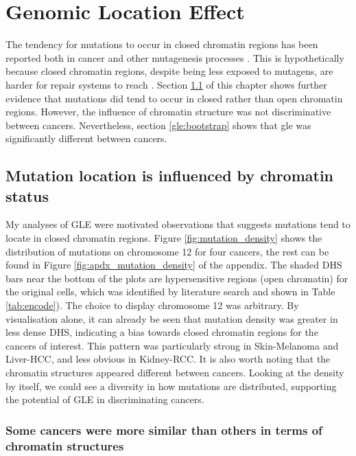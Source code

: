\chapter{Genomic Location Effect}\label{gle}

The tendency for mutations to occur in closed \gls{chromatin} regions has been reported both in cancer and other mutagenesis processes \citep{Polak2015,Prendergast2007ChromatinGenome}. This is hypothetically because closed chromatin regions, despite being less exposed to mutagens, are harder for repair systems to reach \citep{Prendergast2007ChromatinGenome,Teng1997ExcisionSequences, Morse2002PhotoreactivationCerevisiae}. Section \ref{gle:chromatin} of this chapter shows further evidence that mutations did tend to occur in closed rather than open chromatin regions. However, the influence of chromatin structure was not discriminative between cancers. Nevertheless, section \ref{gle:bootstrap} shows that \gls{gle} was significantly different between cancers. 

\section{Mutation location is influenced by chromatin status}\label{gle:chromatin}
My analyses of GLE were motivated observations that suggests mutations tend to locate in closed chromatin regions. Figure \ref{fig:mutation_density} shows the distribution of mutations on chromosome 12 for four cancers, the rest can be found in Figure \ref{fig:apdx_mutation_density} of the appendix. The shaded DHS bars near the bottom of the plots are hypersensitive regions (open chromatin) for the original cells, which was identified by literature search and shown in Table \ref{tab:encode}). The choice to display chromosome 12 was arbitrary. By visualisation alone, it can already be seen that mutation density was greater in less dense DHS, indicating a bias towards closed chromatin regions for the cancers of interest. This pattern was particularly strong in Skin-Melanoma and Liver-HCC, and less obvious in Kidney-RCC. It is also worth noting that the chromatin structures appeared different between cancers. Looking at the density by itself, we could see a diversity in how mutations are distributed, supporting the potential of GLE in discriminating cancers. 



\subsection{Some cancers were more similar than others in terms of chromatin structures}


